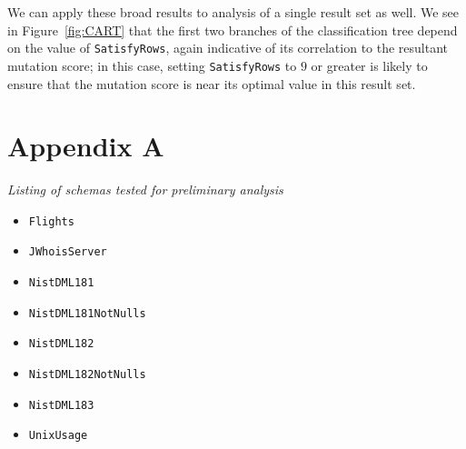 \documentclass[a4paper,twocolumn]{article}
\begin{document}
We can apply these broad results to analysis of a single result set as well. We see in Figure~\ref{fig:CART} that the first two branches of the classification tree depend on the value of \texttt{SatisfyRows}, again indicative of its correlation to the resultant mutation score; in this case, setting \texttt{SatisfyRows} to $9$ or greater is likely to ensure that the mutation score is near its optimal value in this result set.





\pagebreak

\section*{Appendix A} \label{appA}
\textit{Listing of schemas tested for preliminary analysis}
\begin{itemize}
\item \texttt{Flights}
\item \texttt{JWhoisServer}
\item \texttt{NistDML181}
\item \texttt{NistDML181NotNulls}
\item \texttt{NistDML182}
\item \texttt{NistDML182NotNulls}
\item \texttt{NistDML183}
\item \texttt{UnixUsage}
\end{itemize}
\end{document}
